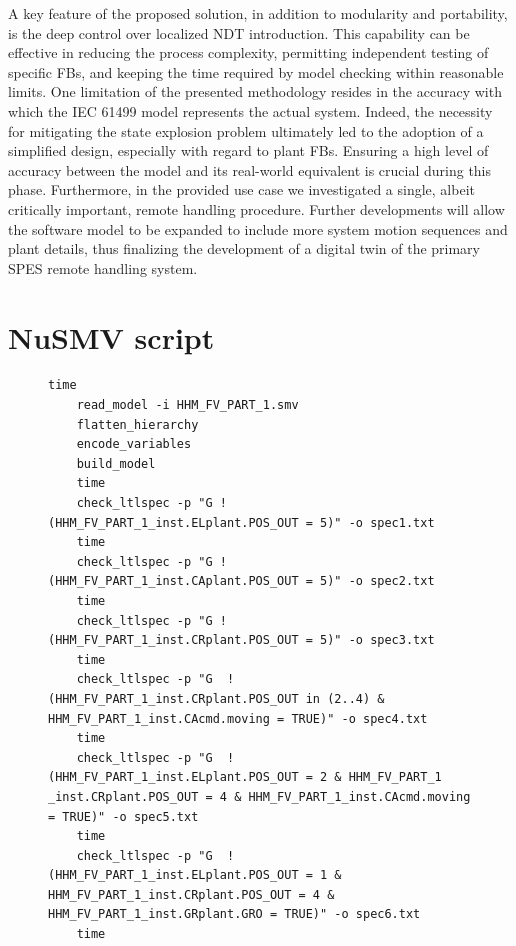 \documentclass{ieeeojies}
\begin{document}
A key feature of the proposed solution, in addition to modularity and portability, is the deep control over localized NDT introduction. This capability can be effective in reducing the process complexity, permitting independent testing of specific FBs, and keeping the time required by model checking within reasonable limits. 
One limitation of the presented methodology resides in the accuracy with which the IEC 61499 model represents the actual system. Indeed, the necessity for mitigating the state explosion problem ultimately led to the adoption of a simplified design, especially with regard to plant FBs. 
Ensuring a high level of accuracy between the model and its real-world equivalent is crucial during this phase. Furthermore, in the provided use case we investigated a single, albeit critically important, remote handling procedure. 
Further developments will allow the software model to be expanded to include more system motion sequences and plant details, thus finalizing the development of a digital twin of the primary SPES remote handling system.


\appendices
\section{NuSMV script}
\label{appA:NuSMV script}
\begin{figure}[h!]
    \centering
    \begin{lstlisting}[caption=Batch script used to check the LTL specifications with NuSMV.]
    time
    read_model -i HHM_FV_PART_1.smv
    flatten_hierarchy
    encode_variables
    build_model
    time
    check_ltlspec -p "G !(HHM_FV_PART_1_inst.ELplant.POS_OUT = 5)" -o spec1.txt
    time
    check_ltlspec -p "G !(HHM_FV_PART_1_inst.CAplant.POS_OUT = 5)" -o spec2.txt
    time
    check_ltlspec -p "G !(HHM_FV_PART_1_inst.CRplant.POS_OUT = 5)" -o spec3.txt
    time
    check_ltlspec -p "G  !(HHM_FV_PART_1_inst.CRplant.POS_OUT in (2..4) & HHM_FV_PART_1_inst.CAcmd.moving = TRUE)" -o spec4.txt
    time
    check_ltlspec -p "G  !(HHM_FV_PART_1_inst.ELplant.POS_OUT = 2 & HHM_FV_PART_1 _inst.CRplant.POS_OUT = 4 & HHM_FV_PART_1_inst.CAcmd.moving = TRUE)" -o spec5.txt
    time
    check_ltlspec -p "G  !(HHM_FV_PART_1_inst.ELplant.POS_OUT = 1 & HHM_FV_PART_1_inst.CRplant.POS_OUT = 4 & HHM_FV_PART_1_inst.GRplant.GRO = TRUE)" -o spec6.txt
    time
    \end{lstlisting}
    \label{lst:ltl specs}
\end{figure}
\end{document}
